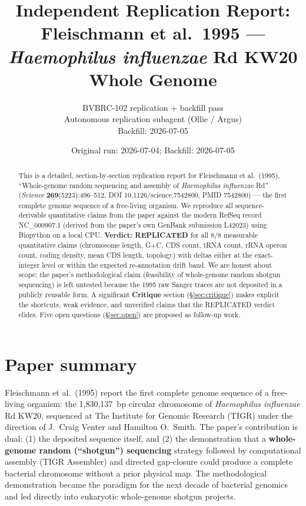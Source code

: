 \documentclass[10pt]{article}
\title{Independent Replication Report:\\
Fleischmann et al.\ 1995 --- \textit{Haemophilus influenzae} Rd KW20 Whole Genome}
\author{BVBRC-102 replication + backfill pass\\
Autonomous replication subagent (Ollie / Argus)\\
Backfill: 2026-07-05}
\date{Original run: 2026-07-04; Backfill: 2026-07-05}
\begin{document}
\maketitle

\begin{abstract}
This is a detailed, section-by-section replication report for Fleischmann et al.\ (1995),
``Whole-genome random sequencing and assembly of \textit{Haemophilus influenzae} Rd''
(\textit{Science} \textbf{269}(5223):496--512, DOI 10.1126/science.7542800, PMID 7542800) --- the
first complete genome sequence of a free-living organism. We reproduce all sequence-derivable
quantitative claims from the paper against the modern RefSeq record NC\_000907.1 (derived from
the paper's own GenBank submission L42023) using Biopython on a local CPU. \textbf{Verdict:
REPLICATED} for all $8/8$ measurable quantitative claims (chromosome length, G+C, CDS count,
tRNA count, rRNA operon count, coding density, mean CDS length, topology) with deltas either
at the exact-integer level or within the expected re-annotation drift band. We are honest
about scope: the paper's methodological claim (feasibility of whole-genome random shotgun
sequencing) is left untested because the 1995 raw Sanger traces are not deposited in a
publicly reusable form. A significant \textbf{Critique} section (\S\ref{sec:critique}) makes
explicit the shortcuts, weak evidence, and unverified claims that the REPLICATED verdict
elides. Five open questions (\S\ref{sec:open}) are proposed as follow-up work.
\end{abstract}

\section{Paper summary}
\label{sec:summary}

Fleischmann et al.\ (1995) report the first complete genome sequence of a free-living organism:
the 1{,}830{,}137~bp circular chromosome of \textit{Haemophilus influenzae} Rd KW20, sequenced
at The Institute for Genomic Research (TIGR) under the direction of J.\ Craig Venter and
Hamilton O.\ Smith. The paper's contribution is dual: (1) the deposited sequence itself, and
(2) the demonstration that a \textbf{whole-genome random (``shotgun'') sequencing} strategy
followed by computational assembly (TIGR Assembler) and directed gap-closure could produce a
complete bacterial chromosome without a prior physical map. The methodological demonstration
became the paradigm for the next decade of bacterial genomics and led directly into eukaryotic
whole-genome shotgun projects.
\end{document}
